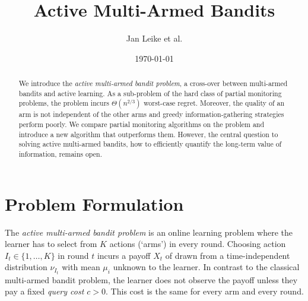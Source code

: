 \documentclass[a4paper]{article}
\begin{document}

\title{Active Multi-Armed Bandits}
\author{Jan Leike et al.}
\date{\today}

\maketitle


\begin{abstract}%
We introduce the \emph{active multi-armed bandit problem},
a cross-over between multi-armed bandits and active learning.
As a sub-problem of the hard class of partial monitoring problems,
the problem incurs $\Theta(n^{2/3})$ worst-case regret.
Moreover,
the quality of an arm is not independent of the other arms
and greedy information-gathering strategies perform poorly.
We compare partial monitoring algorithms on the problem and
introduce a new algorithm that outperforms them.
However,
the central question to solving active multi-armed bandits,
how to efficiently quantify the long-term value of information,
remains open.
\end{abstract}



\section{Problem Formulation}

The \emph{active multi-armed bandit problem} is
an online learning problem
where the learner has to select from $K$ actions (`arms') in every round.
Choosing action $I_t \in \{ 1, \ldots, K \}$ in round $t$
incurs a payoff $X_t$ of
drawn from a time-independent distribution $\nu_{I_t}$
with mean $\mu_i$ unknown to the learner.
In contrast to the classical multi-armed bandit problem,
the learner does not observe the payoff
unless they pay a fixed \emph{query cost $c > 0$}.
This cost is the same for every arm and every round.
\end{document}
